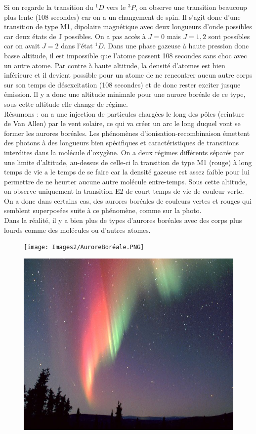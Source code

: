 Si on regarde la transition du $^1D$ vers le $^3P$, on observe une transition beaucoup plus lente (108 secondes) car on a un changement de spin. Il s'agit donc d'une transition de type M1, dipolaire magnétique avec deux longueurs d'onde possibles car deux états de J possibles. On a pas accès à $J=0$ mais $J=1,2$ sont possibles car on avait $J=2$ dans l'état $^1D$. Dans une phase gazeuse à haute pression donc basse altitude, il est impossible que l'atome passent 108 secondes sans choc avec un autre atome. Par contre à haute altitude, la densité d'atomes est bien inférieure et il devient possible pour un atome de ne rencontrer aucun autre corps sur son temps de désexcitation (108 secondes) et de donc rester exciter jusque émission. Il y a donc une altitude minimale pour une aurore boréale de ce type, sous cette altitude elle change de régime.\\

Résumons : on a une injection de particules chargées le long des pôles (ceinture de Van Allen) par le vent solaire, ce qui va créer un arc le long duquel vont se former les aurores boréales. Les phénomènes d'ionisation-recombinaison émettent des photons à des longueurs bien spécifiques et caractéristiques de transitions interdites dans la molécule d'oxygène. On a deux régimes différents séparés par une limite d'altitude, au-dessus de celle-ci la transition de type M1 (rouge) à long temps de vie a le temps de se faire car la densité gazeuse est assez faible pour lui permettre de ne heurter aucune autre molécule entre-temps. Sous cette altitude, on observe uniquement la transition E2 de court temps de vie de couleur verte. On a donc dans certains cas, des aurores boréales de couleurs vertes et rouges qui semblent superposées suite à ce phénomène, comme sur la photo.\\

Dans la réalité, il y a bien plus de types d'aurores boréales avec des corps plus lourds comme des molécules ou d'autres atomes.\\

\begin{figure}[tph]
    \centering
    \texttt{[image: Images2/AuroreBoréale.PNG]}
\end{figure}
\begin{figure}[tph]
    \centering
    \includegraphics[scale=0.6]{Images2/photoAurore.jpg}
\end{figure}